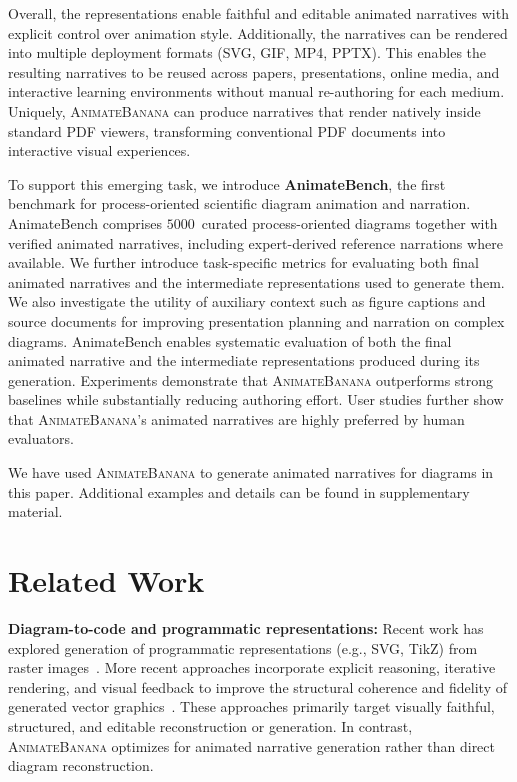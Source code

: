 \documentclass{article} %
\newcommand{\benchCount}{$5000$~}
\begin{document}
Overall, the representations enable faithful and editable animated narratives with explicit control over animation style. Additionally, the narratives can be rendered into multiple deployment formats  (SVG, GIF, MP4, PPTX). This enables the resulting narratives to be reused across papers, presentations, online media, and interactive learning environments without manual re-authoring for each medium. Uniquely, \textsc{AnimateBanana} can produce narratives that render natively inside standard PDF viewers, transforming conventional PDF documents into interactive visual experiences.

To support this emerging task, we introduce \textbf{AnimateBench}, the first benchmark for process-oriented scientific diagram animation and narration. AnimateBench comprises \benchCount curated process-oriented diagrams together with verified animated narratives, including expert-derived reference narrations where available. We further introduce task-specific metrics for
evaluating both final animated narratives and the intermediate representations
used to generate them. We also investigate the utility of auxiliary context such as figure captions and source documents for improving presentation planning and narration on complex diagrams. AnimateBench enables systematic evaluation of both the final animated narrative and the intermediate representations produced during its generation. Experiments demonstrate that \textsc{AnimateBanana} outperforms strong baselines while substantially reducing authoring effort. User studies further show that \textsc{AnimateBanana}'s animated narratives are highly preferred by human evaluators.

We have used \textsc{AnimateBanana} to generate animated narratives for diagrams in this paper. Additional examples and details can be found in supplementary material.


\section{Related Work}

\noindent\textbf{Diagram-to-code and programmatic representations:}
Recent work has explored generation of programmatic representations (e.g.,
SVG, TikZ) from raster images~\citep{starvector,renderingaware,geosvgrl,
belouadi2023automatikz,belouadi2024detikzify}. More recent approaches
incorporate explicit reasoning, iterative rendering, and visual feedback to
improve the structural coherence and fidelity of generated vector
graphics~\citep{wang2026reliable,liang2026render}. These approaches primarily
target visually faithful, structured, and editable reconstruction or
generation. In contrast, \textsc{AnimateBanana} optimizes for animated narrative generation rather than direct diagram reconstruction.
\end{document}
